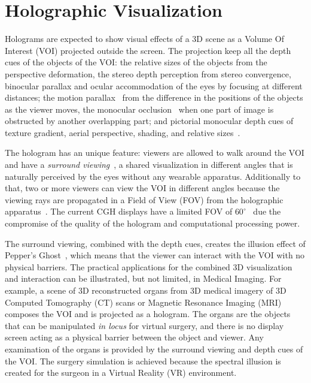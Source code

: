 \section{Holographic Visualization}
\label{sec.holographic_visualization}

Holograms are expected to show visual effects of a 3D scene as a Volume Of Interest (VOI) projected outside the screen. The projection keep all the depth cues of the objects of the VOI: the relative sizes of the objects from the perspective deformation, the stereo depth perception from stereo convergence, binocular parallax and ocular accommodation of the eyes by focusing at different distances; the motion parallax~\cite{li2012} from the difference in the positions of the objects as the viewer moves, the monocular occlusion~\cite{Lucente1995} when one part of image is obstructed by another overlapping part; and pictorial monocular depth cues of texture gradient, aerial perspective, shading, and relative sizes~\cite{Lucente1995}. 

The hologram has an unique feature: viewers are allowed to walk around the VOI and have a \emph{surround viewing}~\cite{debevec2006}, a shared visualization in different angles that is naturally perceived by the eyes without any wearable apparatus. Additionally to that, two or more viewers can view the VOI in different angles because the viewing rays are propagated in a Field of View (FOV) from the holographic apparatus~\cite{Lucente1992}. The current CGH displays have a limited FOV of $60^{\circ}$~\cite{Slinger2005, Lucente1995} due the compromise of the quality of the hologram and computational processing power.

The surround viewing, combined with the depth cues, creates the illusion effect of Pepper's Ghost~\cite{smithwick2014}, which means that the viewer can interact with the VOI with no physical barriers. The practical applications for the combined 3D visualization and interaction can be illustrated, but not limited, in Medical Imaging. For example, a scene of 3D reconstructed organs from 3D medical imagery of 3D Computed Tomography (CT) scans or Magnetic Resonance Imaging (MRI) composes the VOI and is projected as a hologram. The organs are the objects that can be manipulated \emph{in locus} for virtual surgery, and there is no display screen acting as a physical barrier between the object and viewer. Any examination of the organs is provided by the surround viewing and depth cues of the VOI. The surgery simulation is achieved because the spectral illusion is created for the surgeon in a Virtual Reality (VR) environment.




%